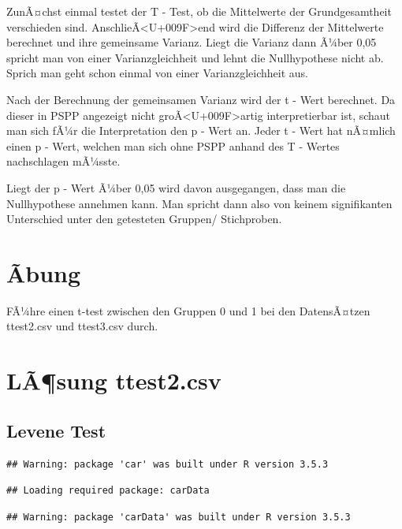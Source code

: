 \documentclass[
]{book}
\begin{document}
ZunÃ¤chst einmal testet der T - Test, ob die Mittelwerte der Grundgesamtheit verschieden sind. AnschlieÃ\textless U+009F\textgreater end wird die Differenz der Mittelwerte berechnet und ihre gemeinsame Varianz. Liegt die Varianz dann Ã¼ber 0,05 spricht man von einer Varianzgleichheit und lehnt die Nullhypothese nicht ab. Sprich man geht schon einmal von einer Varianzgleichheit aus.

Nach der Berechnung der gemeinsamen Varianz wird der t - Wert berechnet. Da dieser in PSPP angezeigt nicht groÃ\textless U+009F\textgreater artig interpretierbar ist, schaut man sich fÃ¼r die Interpretation den p - Wert an. Jeder t - Wert hat nÃ¤mlich einen p - Wert, welchen man sich ohne PSPP anhand des T - Wertes nachschlagen mÃ¼sste.

Liegt der p - Wert Ã¼ber 0,05 wird davon ausgegangen, dass man die Nullhypothese annehmen kann. Man spricht dann also von keinem signifikanten Unterschied unter den getesteten Gruppen/ Stichproben.

\hypertarget{uxe3bung-1}{%
\section{Ãbung}\label{uxe3bung-1}}

FÃ¼hre einen t-test zwischen den Gruppen 0 und 1 bei den DatensÃ¤tzen ttest2.csv und ttest3.csv durch.

\hypertarget{luxe3sung-ttest2.csv}{%
\section{LÃ¶sung ttest2.csv}\label{luxe3sung-ttest2.csv}}

\hypertarget{levene-test}{%
\subsection{Levene Test}\label{levene-test}}

\begin{verbatim}
## Warning: package 'car' was built under R version 3.5.3
\end{verbatim}

\begin{verbatim}
## Loading required package: carData
\end{verbatim}

\begin{verbatim}
## Warning: package 'carData' was built under R version 3.5.3
\end{verbatim}
\end{document}
